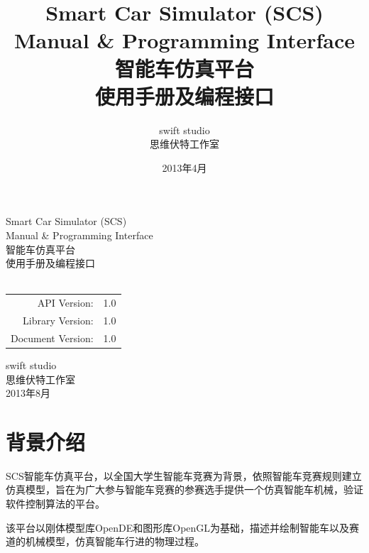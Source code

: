 \documentclass[titlepage,a4paper]{ctexart}
\begin{document}
\newcommand{\HRule}{\rule{\linewidth}{0.5mm}}
\title{Smart Car Simulator (SCS) \\ Manual \& Programming Interface \\ 智能车仿真平台 \\ 使用手册及编程接口}
\author{swift studio \\ 思维伏特工作室}
\date{2013年4月}

\begin{titlepage}

\begin{center}
\textrm{\LARGE Smart Car Simulator (SCS)}\\[0.5cm]
\textrm{\LARGE Manual \& Programming Interface}\\[0.8cm]
\textrm{\LARGE 智能车仿真平台 }\\[0.5cm]
\textrm{\LARGE 使用手册及编程接口}\\[0.5cm]
\textrm{}\\[1.5cm]
\begin{tabular}{rr}
\textrm{API Version:} & \textrm{1.0} \\
\textrm{Library Version:} & \textrm{1.0} \\
\textrm{Document Version:} & \textrm{1.0} \\
\end{tabular}

\vfill
{\large
\textrm{swift studio \\ 思维伏特工作室} \\
2013年8月 \\[4.0cm]
}

\end{center}
\end{titlepage}

\tableofcontents
\newpage

\section{背景介绍}
SCS智能车仿真平台，以全国大学生智能车竞赛为背景，依照智能车竞赛规则建立仿真模型，旨在为广大参与智能车竞赛的参赛选手提供一个仿真智能车机械，验证软件控制算法的平台。

该平台以刚体模型库OpenDE和图形库OpenGL为基础，描述并绘制智能车以及赛道的机械模型，仿真智能车行进的物理过程。
\end{document}
